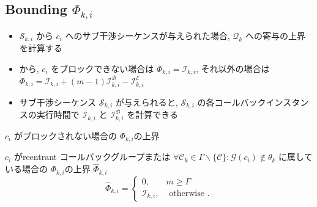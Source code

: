 \subsection{Bounding $\Phi_{k, i}$}
\label{ssec: bounding_phi}

\begin{frame}{}
    \begin{itemize}
        \item $\mathcal{S}_{k, i}$ から $c_{i}$ へのサブ干渉シーケンスが与えられた場合, $\mathcal{Q}_{k}$ への寄与の上界を計算する
        \item {}から, $c_{i}$ をブロックできない場合は $\Phi_{k, i}=\mathcal{I}_{k, i}$, それ以外の場合は $\Phi_{k, i}=\mathcal{I}_{k, i}+(m-1) \mathcal{I}_{k, i}^{\mathcal{B}}-\mathcal{I}_{k, i}^{\mathcal{E}}$
        \item サブ干渉シーケンス $\mathcal{S}_{k, i}$ が与えられると, $\mathcal{S}_{k, i}$ の各コールバックインスタンスの実行時間で $\mathcal{I}_{k, i}$ と $\mathcal{I}_{k, i}^{\mathcal{B}}$ を計算できる
    \end{itemize}
\end{frame}

\begin{frame}{$c_{i}$ がブロックされない場合の $\Phi_{k, i}$の上界}
    \begin{definition}
        $c_{i}$ がreentrant コールバックグループまたは $\forall \mathcal{C}_{k} \in \Gamma \backslash\{\mathcal{C}\}: \mathcal{G}\left(c_{i}\right) \notin \theta_{k}$ に属している場合の $\Phi_{k, i}$の上界 $\hat{\Phi}_{k, i}$
        \begin{equation*}
            \hat{\Phi}_{k, i}=\left\{\begin{array}{lr}
                0,                  & m \geq \Gamma         \\
                \mathcal{I}_{k, i}, & \text { otherwise } .
            \end{array}\right.
        \end{equation*}
    \end{definition}
\end{frame}

